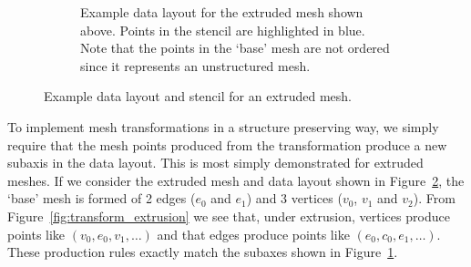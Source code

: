 \begin{figure}
\begin{subfigure}{\textwidth}
    \caption{
      Example data layout for the extruded mesh shown above.
      Points in the stencil are highlighted in blue.
      Note that the points in the `base' mesh are not ordered since it represents an unstructured mesh.
    }
    \label{fig:extruded_data}
  \end{subfigure}
  \caption{Example data layout and stencil for an extruded mesh.}
  \label{fig:extruded_patch_and_data}
\end{figure}

To implement mesh transformations in a structure preserving way, we simply require that the mesh points produced from the transformation produce a new subaxis in the data layout.
This is most simply demonstrated for extruded meshes.
If we consider the extruded mesh and data layout shown in Figure~\ref{fig:extruded_patch_and_data}, the `base' mesh is formed of 2 edges ($e_0$ and $e_1$) and 3 vertices ($v_0$, $v_1$ and $v_2$).
From Figure~\ref{fig:transform_extrusion} we see that, under extrusion, vertices produce points like $(v_0, e_0, v_1, \dots)$ and that edges produce points like $(e_0, c_0, e_1, \dots)$.
These production rules exactly match the subaxes shown in Figure~\ref{fig:extruded_data}.

